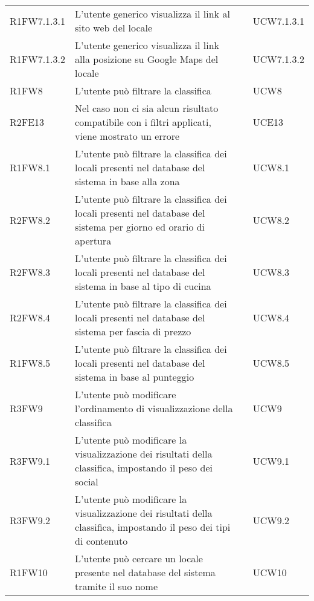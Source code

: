 \begin{longtable}{ m{}<{\centering}  m{}<{\centering}  m{}<{\centering}  m{}<{\centering}}
	R1FW7.1.3.1 & L'utente generico visualizza il link al sito web del locale & \Ob & UCW7.1.3.1 \\
	
	R1FW7.1.3.2 &	L'utente generico visualizza il link alla posizione su Google Maps del locale & \Ob & UCW7.1.3.2 \\		
	 
	R1FW8 & L’utente può filtrare la classifica & \Ob & UCW8\\		
	
	R2FE13 & Nel caso non ci sia alcun risultato compatibile con i filtri applicati, viene mostrato un errore & \De & UCE13\\	
	 
	R1FW8.1 & L’utente può filtrare la classifica dei locali presenti nel database del sistema in base alla zona & \Ob & UCW8.1\\	
	 
	R2FW8.2 & L’utente può filtrare la classifica dei locali presenti nel database del sistema per giorno ed orario di apertura & \De & UCW8.2\\	
	 
	R2FW8.3 & L’utente può filtrare la classifica dei locali presenti nel database del sistema in base al tipo di cucina & \De & UCW8.3\\	
	 
	R2FW8.4 & L’utente può filtrare la classifica dei locali presenti nel database del sistema per fascia di prezzo & \De & UCW8.4\\	 
	 
	R1FW8.5 & L’utente può filtrare la classifica dei locali presenti nel database del sistema in base al punteggio & \Ob & UCW8.5\\	 
	 
	R3FW9 & L’utente può modificare l’ordinamento di visualizzazione della classifica & \Fa & UCW9\\	
	 
	R3FW9.1 & L’utente può modificare la visualizzazione dei risultati della classifica, impostando il peso dei social & \Fa & UCW9.1\\	 
	 
	R3FW9.2 & L’utente può modificare la visualizzazione dei risultati della classifica, impostando il peso dei tipi di contenuto & \Fa & UCW9.2\\	  
	 
	R1FW10 & L’utente può cercare un locale presente nel database del sistema tramite il suo nome & \Ob & UCW10 \\	 
	 

\end{longtable}
